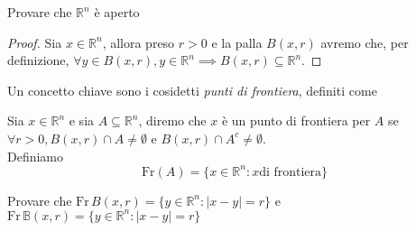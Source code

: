 \begin{exercise}
	Provare che $\mathbb{R}^n$ è aperto
\end{exercise}
\begin{proof}
	Sia $x \in \mathbb{R}^n$, allora preso $r > 0$ e la palla $B(x, r)$ avremo che, per definizione, $\forall y \in B(x, r), y \in \mathbb{R}^n \implies B(x, r) \subseteq \mathbb{R}^n$.
\end{proof}

Un concetto chiave sono i cosidetti \emph{punti di frontiera}, definiti come
\begin{definition}
	Sia $x \in \mathbb{R}^n$ e sia $A \subseteq \mathbb{R}^n$, diremo che $x$ è un punto di frontiera per $A$ se $\forall r > 0, B(x, r) \cap A \neq \emptyset$ e $B(x, r) \cap A^c \neq \emptyset$. \\
	Definiamo
	$$
	\text{Fr}(A)=\{x \in \mathbb{R}^n : x \text{di frontiera} \}
	$$
\end{definition}
\begin{exercise}
	Provare che $\text{Fr} \, B(x, r) = \{y \in \mathbb{R}^n : |x-y| = r \}$ e $\text{Fr} \, \mathbb{B}(x, r) = \{y \in \mathbb{R}^n : |x-y| = r \}$
\end{exercise}
